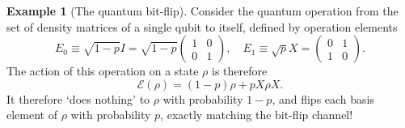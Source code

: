 \documentclass[12pt,a4paper]{report}
\numberwithin{equation}{section}
\theoremstyle{definition}
\theoremstyle{theorem}
\theoremstyle{theorem}
\theoremstyle{example}
\newtheorem{example}{Example}[section]
\theoremstyle{definition}
\begin{document}
\begin{example}[The quantum bit-flip]
	Consider the quantum operation from the set of density matrices of a single qubit to itself, defined by operation elements
	\begin{equation}
		E_{0}\equiv\sqrt{1-p}I=\sqrt{1-p}\begin{pmatrix}
			1&0\\0&1
		\end{pmatrix},\quad E_{1}\equiv\sqrt{p}X=\begin{pmatrix}
		0&1\\1&0
	\end{pmatrix}.
	\end{equation}
	The action of this operation on a state $\rho$ is therefore 
	\begin{equation}
		\mathcal{E}(\rho)=(1-p)\rho+pX\rho X.
	\end{equation}
	It therefore `does nothing' to $\rho$ with probability $1-p$, and flips each basis element of $\rho$ with probability $p$, exactly matching the bit-flip channel!
\end{example}
\end{document}
